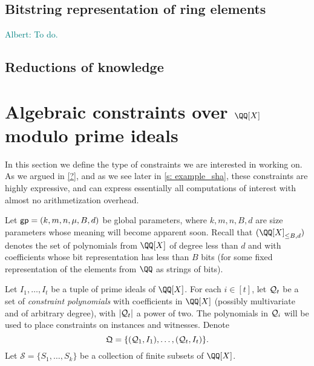 \documentclass[11pt,letterpaper,usenames,dvipsnames]{article}
\newcommand{\albert}[1]{\textcolor{teal}{Albert: {#1}}}
\begin{document}
\subsection{Bitstring representation of ring elements}\label{s: bistring_reps}
\albert{To do.}

\subsection{Reductions of knowledge}

\section{Algebraic constraints over $\QQ[X]$ modulo prime ideals}

In this section we define the type of constraints we are interested in working on. As we argued in \cref{?}, and as we see later in \cref{s: example_sha}, these constraints are highly expressive, and can  express essentially all computations of interest with almost no arithmetization overhead.

\newcommand{\evalconstraints}{\text{\emph{Eval}}}
\newcommand{\mainQpolyring}{(\QQ[X]_{\leq B, d})}
\newcommand{\mainQpolyringmultilin}{(\QQ[X]_{\leq B, d})^{\multilin}}



%

\newcommand{\megaQ}{\mathfrak{Q}}
\renewcommand{\ff}{\mathbf{f}}
\newcommand{\cS}{\mathcal{S}}
\newcommand{\gpunrolled}{(k, m, n, \mu, B, d)}

Let $\gp = \gpunrolled$ be global parameters, where $k,m,n,B,d$ are size parameters whose meaning will become apparent soon. Recall that $\mainQpolyring$ denotes the set of polynomials from $\QQ[X]$ of degree less than $d$ and with coefficients whose bit representation has less than $B$ bits (for some fixed representation of the elements from $\QQ$ as strings of bits).

Let $I_1,\ldots, I_t$ be a tuple of prime ideals of $\QQ[X]$. For each $i\in [t]$, let $\mathcal{Q}_t$ be a set  of \emph{constraint polynomials} with coefficients in $\QQ[X]$ (possibly multivariate and of arbitrary degree), with $|\mathcal{Q}_t|$ a power of two.  The polynomials in $\mathcal{Q}_i$ will be used to place constraints on instances and witnesses.
Denote 
%
$$
\megaQ = \{(\cQ_1, I_1), \ldots, (\cQ_t, I_t)\}.
$$
%
Let $\cS=\{S_1, \ldots, S_k\}$ be a collection of finite subsets of $\QQ[X]$.
%
 
\end{document}
